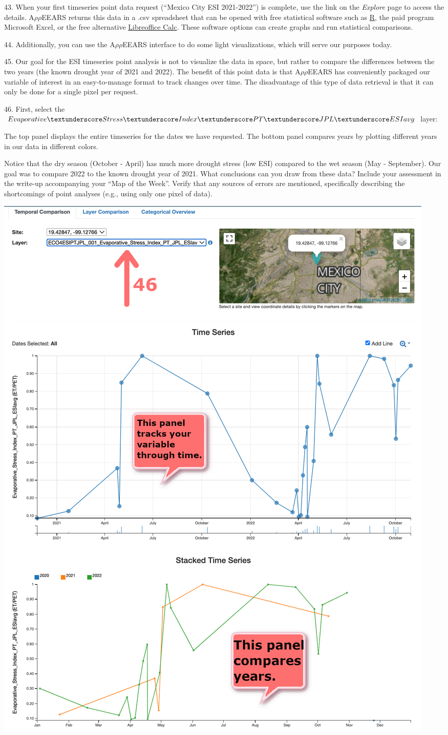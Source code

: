 \documentclass[oneside,a4paper,11pt,explicit]{book}
\begin{document}
43. When your first timeseries point data request (``Mexico City ESI 2021-2022'') is complete, use the link on the \textit{Explore} page to access the details. A$\rho\rho$EEARS returns this data in a .csv spreadsheet that can be opened with free statistical software such as \href{https://www.r-project.org/about.html}{R}, the paid program Microsoft Excel, or the free alternative \href{https://www.libreoffice.org/}{Libreoffice Calc}. These software options can create graphs and run statistical comparisons. 

44. Additionally, you can use the A$\rho\rho$EEARS interface to do some light visualizations, which will serve our purposes today.

45. Our goal for the ESI timeseries point analysis is not to visualize the data in space, but rather to compare the differences between the two years (the known drought year of 2021 and 2022). The benefit of this point data is that A$\rho\rho$EEARS has conveniently packaged our variable of interest in an easy-to-manage format to track changes over time. The disadvantage of this type of data retrieval is that it can only be done for a single pixel per request. 

46. First, select the $Evaporative\textunderscore Stress\textunderscore Index\textunderscore PT\textunderscore JPL\textunderscore ESIavg$ layer:


The top panel displays the entire timeseries for the dates we have requested. The bottom panel compares years by plotting different years in our data in different colors. 

Notice that the dry season (October - April) has much more drought stress (low ESI) compared to the wet season (May - September). Our goal was to compare 2022 to the known drought year of 2021. What conclusions can you draw from these data? Include your assessment in the write-up accompanying your ``Map of the Week''. Verify that any sources of errors are mentioned, specifically describing the shortcomings of point analyses (e.g., using only one pixel of data).

\vspace{.5em}

\centerline{\includegraphics[width=.6\textwidth]{exploreESIpoint.png}}
\end{document}
